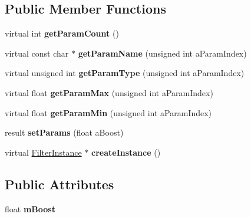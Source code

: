 \subsection*{Public Member Functions}
\begin{DoxyCompactItemize}
\item 
\mbox{\label{class_so_loud_1_1_bassboost_filter_a5d0d08a860eb3d7fea14a6a360abaa28}} 
virtual int {\bfseries get\+Param\+Count} ()
\item 
\mbox{\label{class_so_loud_1_1_bassboost_filter_a66d248076c2c0cdd0036915aa87528cb}} 
virtual const char $\ast$ {\bfseries get\+Param\+Name} (unsigned int a\+Param\+Index)
\item 
\mbox{\label{class_so_loud_1_1_bassboost_filter_a3904ac12b3ace273342831711d5be84d}} 
virtual unsigned int {\bfseries get\+Param\+Type} (unsigned int a\+Param\+Index)
\item 
\mbox{\label{class_so_loud_1_1_bassboost_filter_a4749fd80e890f12fcaff089e59447246}} 
virtual float {\bfseries get\+Param\+Max} (unsigned int a\+Param\+Index)
\item 
\mbox{\label{class_so_loud_1_1_bassboost_filter_a36af55919a08686aab17abe2d3d8d6be}} 
virtual float {\bfseries get\+Param\+Min} (unsigned int a\+Param\+Index)
\item 
\mbox{\label{class_so_loud_1_1_bassboost_filter_aded072ee3842f0f8870b5e24cc6bf94d}} 
result {\bfseries set\+Params} (float a\+Boost)
\item 
\mbox{\label{class_so_loud_1_1_bassboost_filter_aa55ff79a20a17c5ab9cb1ae45fd9a98b}} 
virtual \mbox{\hyperlink{class_so_loud_1_1_filter_instance}{Filter\+Instance}} $\ast$ {\bfseries create\+Instance} ()
\end{DoxyCompactItemize}
\subsection*{Public Attributes}
\begin{DoxyCompactItemize}
\item 
\mbox{\label{class_so_loud_1_1_bassboost_filter_aad8ee489ea88a5fd2bf767205135a1f4}} 
float {\bfseries m\+Boost}
\end{DoxyCompactItemize}


